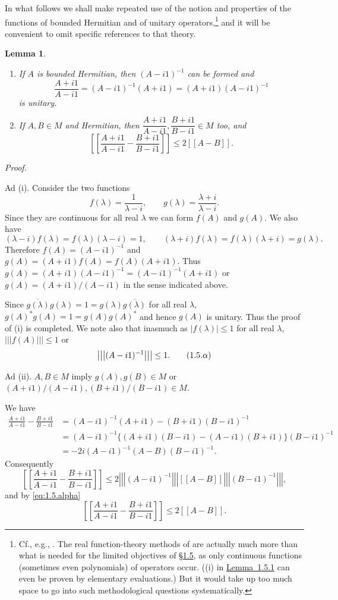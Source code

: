 \documentclass[b5paper,twoside]{article}
\newcommand{\secref}[2]{\hyperref[#1]{\mbox{\S#2}}}
\newcommand{\lemref}[2]{\hyperref[#1]{\mbox{Lemma~#2}}}
\theoremstyle{mvnplain}
\newtheorem{lemma}{Lemma}[section]
\renewenvironment{proof}[1][Proof]{%
  \par\addvspace{0.35\baselineskip}%
  \noindent\textit{#1.}\ \normalfont\ignorespaces
}{%
  \par\addvspace{0.35\baselineskip}%
}
\newcommand{\M}{\mathbf M}
\newcommand{\Metric}[1]{\left[\!\left[#1\right]\!\right]}
\newcommand{\OpNorm}[1]{\left\lvert\left\lvert\left\lvert#1\right\rvert\right\rvert\right\rvert}
\def\M{M}%
\def\Metric#1{[[#1]]}%
\begin{document}
In what follows we shall make repeated use of the notion and properties of the
functions of bounded Hermitian and of unitary operators,\footnote{Cf., e.g.,
\cite[pp.~205 and 220]{ref3}.  The real function-theory methods of \cite{ref3}
are actually much more than what is needed for the limited objectives of
\secref{sec:1.5}{1.5}, as only continuous functions (sometimes even polynomials)
of operators occur.  ((i) in \lemref{lem:1.5.1}{1.5.1} can even be proven by
elementary evaluations.)  But it would take up too much space to go into such
methodological questions systematically.} and it will be convenient to omit
specific references to that theory.

\begin{lemma}\label{lem:1.5.1}
\begin{enumerate}[label=(\roman*)]
\item If $A$ is bounded Hermitian, then $(A-i1)^{-1}$ can be formed and
\[
  \frac{A+i1}{A-i1}=(A-i1)^{-1}(A+i1)=(A+i1)(A-i1)^{-1}
\]
is unitary.
\item If $A,B\in\M$ and Hermitian, then
$\dfrac{A+i1}{A-i1},\dfrac{B+i1}{B-i1}\in\M$ too, and
\[
  \Metric{\frac{A+i1}{A-i1}-\frac{B+i1}{B-i1}}
  \leq2\Metric{A-B}.
\]
\end{enumerate}
\end{lemma}
\begin{proof}
Ad (i).  Consider the two functions
\[
  f(\lambda)=\frac{1}{\lambda-i},\qquad
  g(\lambda)=\frac{\lambda+i}{\lambda-i}.
\]
Since they are continuous for all real $\lambda$ we can form $f(A)$ and $g(A)$.
We also have
\[
  (\lambda-i)f(\lambda)=f(\lambda)(\lambda-i)=1,
  \qquad
  (\lambda+i)f(\lambda)=f(\lambda)(\lambda+i)=g(\lambda).
\]
Therefore $f(A)=(A-i1)^{-1}$ and
$g(A)=(A+i1)f(A)=f(A)(A+i1)$.  Thus
$g(A)=(A+i1)(A-i1)^{-1}=(A-i1)^{-1}(A+i1)$ or
$g(A)=(A+i1)/(A-i1)$ in the sense indicated above.

Since $\overline{g(\lambda)}g(\lambda)=1=g(\lambda)\overline{g(\lambda)}$ for
all real $\lambda$, $g(A)^*g(A)=1=g(A)g(A)^*$ and hence $g(A)$ is unitary.
Thus the proof of (i) is completed.  We note also that inasmuch as
$|f(\lambda)|\leq1$ for all real $\lambda$, $\OpNorm{f(A)}\leq1$ or
\begin{equation}
  \OpNorm{(A-i1)^{-1}}\leq1.
  \tag{1.5.\ensuremath{\alpha}}\label{eq:1.5.alpha}
\end{equation}

Ad (ii).  $A,B\in\M$ imply $g(A),g(B)\in\M$ or
$(A+i1)/(A-i1),(B+i1)/(B-i1)\in\M$.

We have
\begin{align*}
  \frac{A+i1}{A-i1}-\frac{B+i1}{B-i1}
  &=(A-i1)^{-1}(A+i1)-(B+i1)(B-i1)^{-1}\\
  &=(A-i1)^{-1}\{(A+i1)(B-i1)-(A-i1)(B+i1)\}(B-i1)^{-1}\\
  &=-2i(A-i1)^{-1}(A-B)(B-i1)^{-1}.
\end{align*}
Consequently
\[
  \Metric{\frac{A+i1}{A-i1}-\frac{B+i1}{B-i1}}
  \leq2\OpNorm{(A-i1)^{-1}}\Metric{A-B}\OpNorm{(B-i1)^{-1}},
\]
and by \eqref{eq:1.5.alpha}
\[
  \Metric{\frac{A+i1}{A-i1}-\frac{B+i1}{B-i1}}
  \leq2\Metric{A-B}.
\]
\end{proof}
\end{document}
